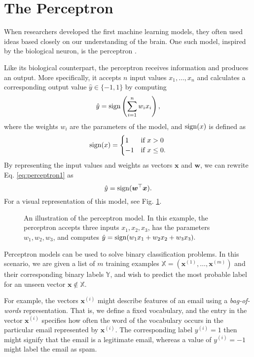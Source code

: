 \section{The Perceptron}
\label{sec:perceptron}
When researchers developed the first machine learning models, they often used ideas based closely on our understanding of the brain. One such model, inspired by the biological neuron, is the perceptron \cite{McCulloch1943115}.

Like its biological counterpart, the perceptron receives information and produces an output. More specifically, it accepts $n$ input values $x_1, \ldots, x_n$ and calculates a corresponding output value $\hat{y} \in \{-1, 1\}$ by computing
\begin{equation}\label{eq:perceptron1}
	\hat{y} = \operatorname{sign}\left (\sum_{i=1}^{n} w_ix_i\right ),
\end{equation}
where the weights $w_i$ are the parameters of the model, and $\operatorname{sign}(x)$ is defined as
\begin{equation}
\operatorname{sign}(x) = \begin{cases} 1 & \text{if }x > 0
							\\-1 & \text{if }x \leq 0.
\end{cases}
\end{equation}
By representing the input values and weights as vectors $\bm{x}$ and $\bm{w}$, we can rewrite Eq. \eqref{eq:perceptron1} as
\begin{equation}
\hat{y} = \operatorname{sign}(\bm{w}^\top\bm{x}).
\end{equation}
For a visual representation of this model, see Fig. \ref{fig:perceptron}. 
\begin{figure}
	\begin{center}
		
	\end{center}
	\caption{An illustration of the perceptron model. In this example, the perceptron accepts three inputs $x_1, x_2, x_3$, has the parameters $w_1, w_2, w_3$, and computes $\hat{y} = \operatorname{sign}(w_1x_1 + w_2x_2 + w_3x_3).$}
	\label{fig:perceptron}
\end{figure}

Perceptron models can be used to solve binary classification problems. In this scenario, we are given a list of $m$ training examples $\mathbb{X} = (\bm{x}^{(1)}, \ldots, \bm{x}^{(m)})$ and their corresponding binary labels $\mathbb{Y}$, and wish to predict the most probable label for an unseen vector $\bm{x} \notin \mathbb{X}$.

For example, the vectors $\bm{x}^{(i)}$ might describe features of an email using a \emph{bag-of-words} representation. That is, we define a fixed vocabulary, and the  entry in the vector $\bm{x}^{(i)}$ specifies how often the  word of the vocabulary occurs in the particular email represented by $\bm{x}^{(i)}$. The corresponding label $y^{(i)} = 1$ then might signify that the email is a legitimate email, whereas a value of $y^{(i)} = -1$ might label the email as spam.

